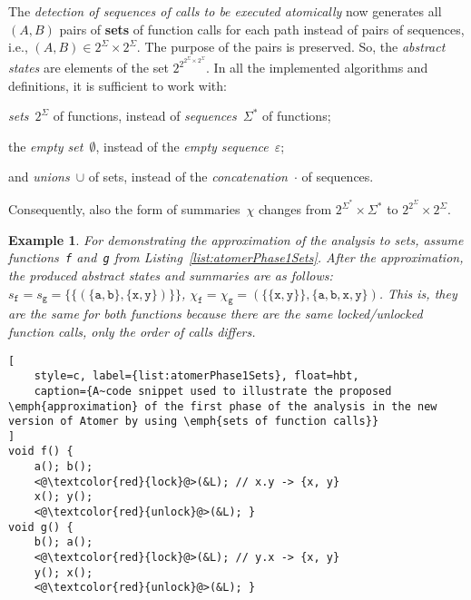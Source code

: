 \documentclass{ExcelAtFIT}
\theoremstyle{example}
\newtheorem{example}{Example}[section]
\begin{document}
The \emph{detection of sequences of calls to be executed atomically} now generates all ${ (A, B) }$ pairs of \textbf{sets} of function calls for each path instead of pairs of sequences, i.e., $ {(A, B)} \in 2^\Sigma \times 2^\Sigma $. The purpose of the pairs is preserved. So, the \emph{abstract states} are elements of the set $ 2^{2^{2^\Sigma \times 2^\Sigma}} $. In all the implemented algorithms and definitions, it is sufficient to work with:
\begin{enuminline}
    \item \emph{sets}~$ 2^\Sigma $ of functions, instead of \emph{sequences}~$ \Sigma^* $ of functions;

    \item the \emph{empty set}~$ \emptyset $, instead of the \emph{empty sequence}~$ \varepsilon $;

    \item and \emph{unions}~$ \cup $ of sets, instead of the \emph{concatenation}~$ \cdot $ of sequences.
\end{enuminline}
Consequently, also the form of summaries~$ \chi $ changes from $ 2^{\Sigma^*} \times \Sigma^* $ to $ 2^{2^\Sigma} \times 2^\Sigma $.

\begin{example}
    For demonstrating the approximation of the analysis to sets, assume functions~\texttt{f} and~\texttt{g} from Listing~\ref{list:atomerPhase1Sets}. After the approximation, the produced abstract states and summaries are as follows: $ s_\mathtt{f} = s_\mathtt{g} = \{\{({\{\mathtt{a}, \mathtt{b}\}}, {\{\mathtt{x}, \mathtt{y}\}})\}\} $, $ \chi_\mathtt{f} = \chi_\mathtt{g} = ({\{\{\mathtt{x}, \mathtt{y}\}\}}, \{\mathtt{a}, \mathtt{b}, \allowbreak \mathtt{x}, \mathtt{y}\}) $. This is, they are the same for both functions because there are the same locked/unlocked function calls, only the order of calls differs.
\end{example}

\begin{lstlisting}[
    style=c, label={list:atomerPhase1Sets}, float=hbt,
    caption={A~code snippet used to illustrate the proposed \emph{approximation} of the first phase of the analysis in the new version of Atomer by using \emph{sets of function calls}}
]
void f() {
    a(); b();
    <@\textcolor{red}{lock}@>(&L); // x.y -> {x, y}
    x(); y();
    <@\textcolor{red}{unlock}@>(&L); }
void g() {
    b(); a();
    <@\textcolor{red}{lock}@>(&L); // y.x -> {x, y}
    y(); x();
    <@\textcolor{red}{unlock}@>(&L); }
\end{lstlisting}
\end{document}
